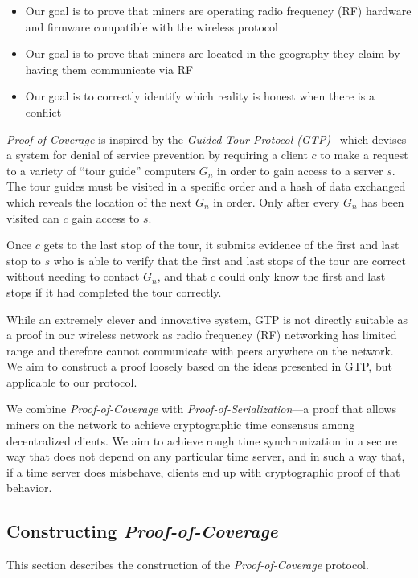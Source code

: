 \documentclass[10pt, nonatbib, nocopyrightspace, reprint]{sigplanconf}
\begin{document}
\begin{itemize}
    \item Our goal is to prove that miners are operating radio frequency (RF) hardware and firmware compatible with the wireless protocol
    \item Our goal is to prove that miners are located in the geography they claim by having them communicate via RF
    \item Our goal is to correctly identify which reality is honest when there is a conflict
\end{itemize}

\emph{Proof-of-Coverage} is inspired by the \emph{Guided Tour Protocol (GTP)}~\cite{gtp} which devises a system for denial of service prevention by requiring a client $c$ to make a request to a variety of ``tour guide'' computers $G_n$ in order to gain access to a server $s$. The tour guides must be visited in a specific order and a hash of data exchanged which reveals the location of the next $G_n$ in order. Only after every $G_n$ has been visited can $c$ gain access to $s$.

Once $c$ gets to the last stop of the tour, it submits evidence of the first and last stop to $s$ who is able to verify that the first and last stops of the tour are correct without needing to contact $G_n$, and that $c$ could only know the first and last stops if it had completed the tour correctly.

While an extremely clever and innovative system, GTP is not directly suitable as a proof in our wireless network as radio frequency (RF) networking has limited range and therefore cannot communicate with peers anywhere on the network. We aim to construct a proof loosely based on the ideas presented in GTP, but applicable to our protocol.

We combine \emph{Proof-of-Coverage} with \emph{Proof-of-Serialization}---a proof that allows miners on the network to achieve cryptographic time consensus among decentralized clients. We aim to achieve rough time synchronization in a secure way that does not depend on any particular time server, and in such a way that, if a time server does misbehave, clients end up with cryptographic proof of that behavior.

\subsection{Constructing \emph{Proof-of-Coverage}}

This section describes the construction of the \emph{Proof-of-Coverage} protocol.
\end{document}
